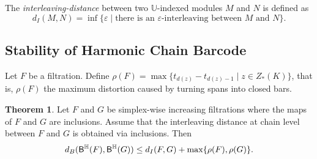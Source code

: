 \documentclass[10pt,a4paper]{amsart}
\newcommand {\mm}[1] {\ifmmode{#1}\else{\mbox{\(#1\)}}\fi}
\newcommand{\har}           {\mm{\mathbb{H}}}
\newcommand{\eps}        {\varepsilon}
\theoremstyle{definition}
\newcommand{\hbarc}{\mathsf{B}^\har}
\newtheorem{theorem}{Theorem}
\newtheorem{proposition}[theorem]{Proposition}
\theoremstyle{remark}
\begin{document}
The \emph{interleaving-distance} between two $\mathbb{U}$-indexed modules $M$ and $N$ is defined as $$ d_I(M,N) = \inf \{\eps\mid \text{there is an $\eps$-interleaving between $M$ and $N$} \}.$$





\subsection{Stability of Harmonic Chain Barcode}\label{subsec:stability}


Let $F$ be a filtration. Define $\rho(F) = \max \{ t_{d(z)} - t_{d(z)-1} \mid z\in Z_*(K)\}$, that is, $\rho(F)$ the maximum distortion caused by turning spans into closed bars.



\begin{theorem}

Let $F$ and $G$ be simplex-wise increasing filtrations where the maps of $F$ and $G$ are inclusions. Assume that the interleaving distance at chain level between $F$ and $G$ is obtained via inclusions. 
Then $$ d_B( {\hbarc(F)}, {\hbarc(G)} ) \leq d_{I}(F,G) +\max \{\rho(F), \rho(G) \}.$$
\end{theorem}
\end{document}
